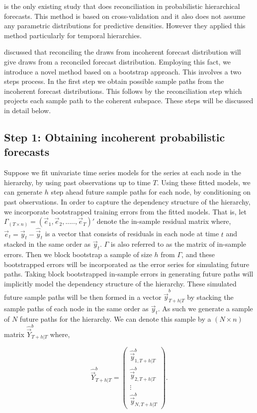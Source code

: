 \documentclass[graybox]{svmult}
\begin{document}
\cite{Jeon2018} is the only existing study that does reconciliation in probabilistic hierarchical forecasts. This method is based on cross-validation and it also does not assume any parametric distributions for predictive densities. However they applied this method particularly for temporal hierarchies. 

\cite{Gamakumara2018} discussed that reconciling the draws from incoherent forecast distribution will give draws from a reconciled forecast distribution. Employing this fact, we introduce a novel method based on a bootstrap approach. This involves a two steps process. In the first step we obtain possible sample paths from the incoherent forecast distributions. This follows by the reconciliation step which projects each sample path to the coherent subspace. These steps will be discussed in detail below. 

\subsection*{Step 1: Obtaining incoherent probabilistic forecasts}

Suppose we fit univariate time series models for the series at each node in the hierarchy, by using past observations up to time $T$. Using these fitted models, we can generate $h$ step ahead future sample paths for each node, by conditioning on past observations. In order to capture the dependency structure of the hierarchy, we incorporate bootstrapped training errors from the fitted models. That is, let $\varGamma_{(T \times n)}=(\vec{e}_1,\vec{e}_2,.....,\vec{e}_T)'$ denote the in-sample residual matrix where, $\vec{e}_t=\vec{y}_t-\hat{\vec{y}}_t$ is a vector that consists of residuals in each node at time $t$ and stacked in the same order as $\vec{y}_t$. $\varGamma$ is also referred to as the matrix of in-sample errors. Then we block bootstrap a sample of size $h$ from $\varGamma$, and these bootstrapped errors will be incorporated as the error series for simulating future paths. Taking block bootstrapped in-sample errors in generating future paths will implicitly model the dependency structure of the hierarchy. These simulated future sample paths will be then formed in a vector $\hat{\vec{y}}_{T+h|T}^b$ by stacking the sample paths of each node in the same order as $\vec{y}_t$. As such we generate a sample of $N$ future paths for the hierarchy. We can denote this sample by a $(N \times n)$ matrix $\hat{\vec{Y}}^b_{T+h|T}$ where, 

\begin{equation} \label{eq:19}
\hat{\vec{Y}}^b_{T+h|T}=\begin{pmatrix}
\hat{\vec{y}}_{1,T+h|T}^b\\
\hat{\vec{y}}_{2,T+h|T}^b\\
\vdots\\
\hat{\vec{y}}_{N,T+h|T}^b
\end{pmatrix}.
\end{equation}
\end{document}
